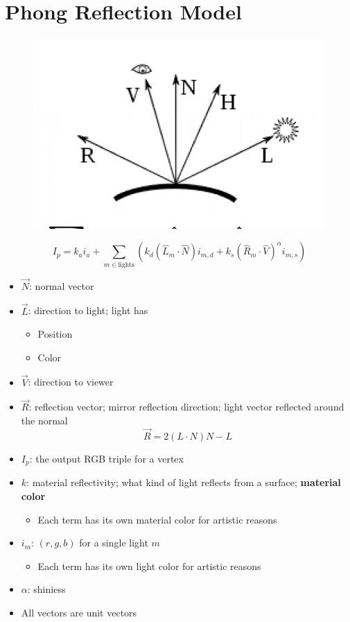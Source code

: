\section{Phong Reflection Model}

\begin{figure}[H]
  \centering
  \includegraphics[width=0.7\columnwidth]{images/shading/phong.png}
\end{figure}

\begin{equation}
  I_{p} = k_{a} i_{a} +
  \sum_{m \in \text{lights}}
  \left(
    k_{d} \left( \hat{L}_{m} \cdot \hat{N} \right) i_{m, d} +
    k_{s} \left( \hat{R}_{m} \cdot \hat{V} \right)^{\alpha} i_{m, s}
  \right)
\end{equation}

\begin{itemize}
  \item $ \vec{N} $: normal vector
  \item $ \vec{L} $: direction to light; light has
  \begin{itemize}
    \item Position
    \item Color
  \end{itemize}
  \item $ \vec{V} $: direction to viewer
  \item $ \vec{R} $: reflection vector; mirror reflection direction; light
  vector reflected around the normal
  \begin{equation}
    \vec{R} = 2 \left( L \cdot N \right) N - L
  \end{equation}
  \item $ I_{p} $: the output RGB triple for a vertex
  \item $ k $: material reflectivity; what kind of light reflects from a
  surface; \textbf{material color}
  \begin{itemize}
    \item Each term has its own material color for artistic reasons
  \end{itemize}

  \item $ i_{m} $: $ \left( r, g, b \right) $ for a single light $ m $
  \begin{itemize}
    \item Each term has its own light color for artistic reasons
  \end{itemize}

  \item $ \alpha $: shiniess
  \item All vectors are unit vectors
\end{itemize}

